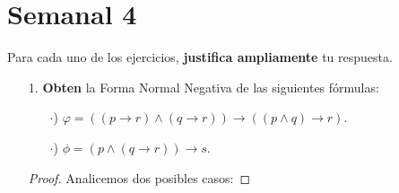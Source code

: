\documentclass{article}
\begin{document}
\section*{\LARGE{Semanal 4}}
Para cada uno de los ejercicios, \textbf{justifica ampliamente} tu respuesta.
\begin{itemize}
\item[1.] \textbf{Obten} la Forma Normal Negativa de las siguientes fórmulas:
  \begin{itemize}
  \item[$\cdot$)] $\varphi = ((p \rightarrow r) \land (q \rightarrow r)) \rightarrow ((p \land q) \rightarrow r).$
  \item[$\cdot$)] $\phi = (p \land (q \rightarrow r)) \rightarrow s.$
  \end{itemize}
  
  \begin{proof} Analicemos dos posibles casos:
    

\end{proof}
\end{itemize}
\end{document}
